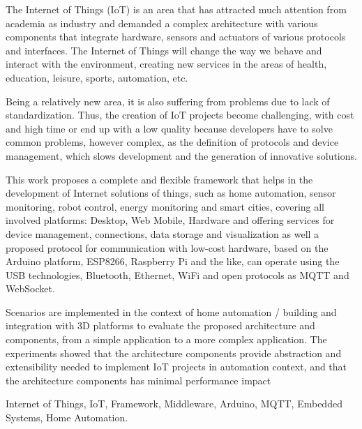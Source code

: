 The Internet of Things (IoT) is an area that has attracted much attention from academia as industry and demanded a complex architecture with various components that integrate hardware, sensors and actuators of various protocols and interfaces. The Internet of Things will change the way we behave and interact with the environment, creating new services in the areas of health, education, leisure, sports, automation, etc.
	
Being a relatively new area, it is also suffering from problems due to lack of standardization. Thus, the creation of IoT projects become challenging, with cost and high time or end up with a low quality because developers have to solve common problems, however complex, as the definition of protocols and device management, which slows development and the generation of innovative solutions.

This work proposes a complete and flexible framework that helps in the development of Internet solutions of things, such as home automation, sensor monitoring, robot control, energy monitoring and smart cities, covering all involved platforms: Desktop, Web Mobile, Hardware and offering services for device management, connections, data storage and visualization as well a proposed protocol for communication with low-cost hardware, based on the Arduino platform, ESP8266, Raspberry Pi and the like, can operate using the USB technologies, Bluetooth, Ethernet, WiFi and open protocols as MQTT and WebSocket.

Scenarios are implemented in the context of home automation / building and integration with 3D platforms to evaluate the proposed architecture and components, from a simple application to a more complex application. The experiments showed that the architecture components provide abstraction and extensibility needed to implement IoT projects in automation context, and that the architecture components has minimal performance impact 

\begin{keywords}
Internet of Things, IoT, Framework, Middleware, Arduino, MQTT, Embedded Systems, Home Automation.
\end{keywords}